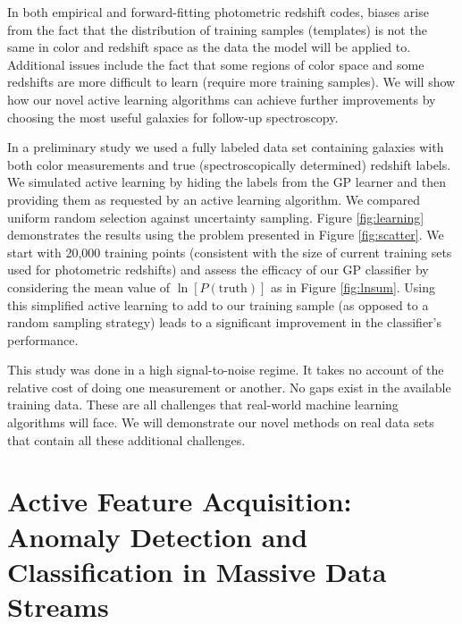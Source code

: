 \documentclass[useAMS,usenatbib,tightenlines,11pt,preprint]{aastex}
\begin{document}
In both empirical and forward-fitting photometric redshift codes, biases
arise from the fact that the distribution of training samples (templates)
is not the same in color and redshift space as the data the model will be
applied to.  Additional issues include the fact that some regions of color
space and some redshifts are more difficult to learn (require more training
samples).  We will show how our novel active learning algorithms can
achieve further improvements by choosing the most useful galaxies for
follow-up spectroscopy.

In a preliminary study we used a fully labeled data set containing galaxies
with both color measurements and true (spectroscopically determined)
redshift labels.  We simulated active learning by hiding the labels from
the GP learner and then providing them as requested by an active learning
algorithm.  We compared uniform random selection against uncertainty
sampling.  Figure \ref{fig:learning} demonstrates the results using the
problem presented in Figure \ref{fig:scatter}. %
We start with 20,000 training points (consistent with the size of
current training sets used for photometric redshifts) and assess the efficacy of our
GP classifier by considering the mean value of $\ln[P(\text{truth})]$ as in
Figure \ref{fig:lnsum}.  Using this simplified active learning to add
to our training sample (as opposed to a random sampling strategy) 
leads to a significant improvement in the classifier's performance.

This study was done in a high signal-to-noise regime.  It takes no account
of the relative cost of doing one measurement or another.  No gaps exist in
the available training data.  These are all challenges that real-world
machine learning algorithms will face.  We will demonstrate our novel
methods on real data sets that contain all these additional challenges.


\section{Active Feature Acquisition:
Anomaly Detection and Classification in Massive Data
 Streams}
\end{document}
